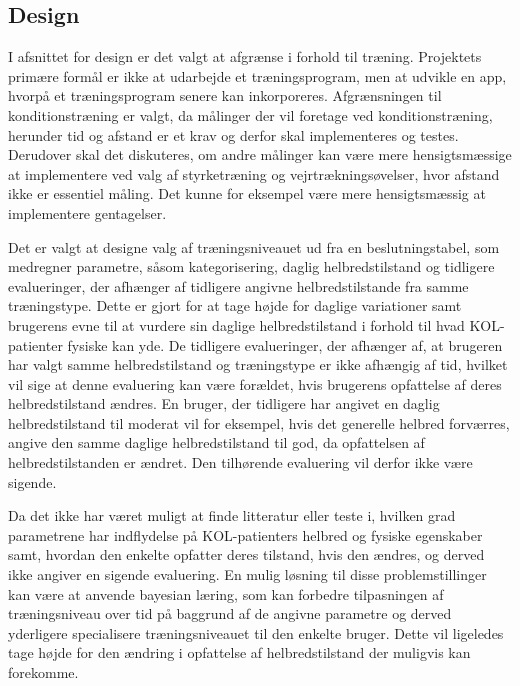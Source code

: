 \subsection{Design}
I afsnittet for design er det valgt at afgrænse i forhold til træning. Projektets primære formål er ikke at udarbejde et træningsprogram, men at udvikle en app, hvorpå et træningsprogram senere kan inkorporeres. Afgrænsningen til konditionstræning er valgt, da målinger der vil foretage ved konditionstræning, herunder tid og afstand er et krav og derfor skal implementeres og testes. Derudover skal det diskuteres, om andre målinger kan være mere hensigtsmæssige at implementere ved valg af styrketræning og vejrtrækningsøvelser, hvor afstand ikke er essentiel måling. Det kunne for eksempel være mere hensigtsmæssig at implementere gentagelser. 

Det er valgt at designe valg af træningsniveauet ud fra en beslutningstabel, som medregner parametre, såsom kategorisering, daglig helbredstilstand og tidligere evalueringer, der afhænger af tidligere angivne helbredstilstande fra samme træningstype. Dette er gjort for at tage højde for daglige variationer samt brugerens evne til at vurdere sin daglige helbredstilstand i forhold til hvad KOL-patienter fysiske kan yde. De tidligere evalueringer, der afhænger af, at brugeren har valgt samme helbredstilstand og træningstype er ikke afhængig af tid, hvilket vil sige at denne evaluering kan være forældet, hvis brugerens opfattelse af deres helbredstilstand ændres. En bruger, der tidligere har angivet en daglig helbredstilstand til moderat vil for eksempel, hvis det generelle helbred forværres, angive den samme daglige helbredstilstand til god, da opfattelsen af helbredstilstanden er ændret. Den tilhørende evaluering vil derfor ikke være sigende. 

Da det ikke har været muligt at finde litteratur eller teste i, hvilken grad parametrene har indflydelse på KOL-patienters helbred og fysiske egenskaber samt, hvordan den enkelte opfatter deres tilstand, hvis den ændres, og derved ikke angiver en sigende evaluering. En mulig løsning til disse problemstillinger kan være at anvende bayesian læring, som kan forbedre tilpasningen af træningsniveau over tid på baggrund af de angivne parametre og derved yderligere specialisere træningsniveauet til den enkelte bruger. Dette vil ligeledes tage højde for den ændring i opfattelse af helbredstilstand der muligvis kan forekomme.

